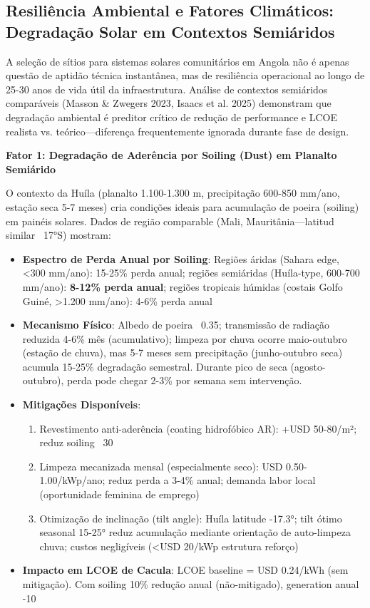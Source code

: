 \documentclass[12pt, a4paper]{article}
\begin{document}
\subsection{Resiliência Ambiental e Fatores Climáticos: Degradação Solar em Contextos Semiáridos}

A seleção de sítios para sistemas solares comunitários em Angola não é apenas questão de aptidão técnica instantânea, mas de resiliência operacional ao longo de 25-30 anos de vida útil da infraestrutura. Análise de contextos semiáridos comparáveis (Masson \& Zwegers 2023, Isaacs et al. 2025) demonstram que degradação ambiental é preditor crítico de redução de performance e LCOE realista vs. teórico—diferença frequentemente ignorada durante fase de design.

\textbf{Fator 1: Degradação de Aderência por Soiling (Dust) em Planalto Semiárido}

O contexto da Huíla (planalto 1.100-1.300 m, precipitação 600-850 mm/ano, estação seca 5-7 meses) cria condições ideais para acumulação de poeira (soiling) em painéis solares. Dados de região comparable (Mali, Mauritânia—latitud similar ~17°S) mostram:

\begin{itemize}
\item \textbf{Espectro de Perda Anual por Soiling}: Regiões áridas (Sahara edge, <300 mm/ano): 15-25\% perda anual; regiões semiáridas (Huíla-type, 600-700 mm/ano): \textbf{8-12\% perda anual}; regiões tropicais húmidas (costais Golfo Guiné, >1.200 mm/ano): 4-6\% perda anual
\item \textbf{Mecanismo Físico}: Albedo de poeira ~0.35; transmissão de radiação reduzida 4-6\% mês (acumulativo); limpeza por chuva ocorre maio-outubro (estação de chuva), mas 5-7 meses sem precipitação (junho-outubro seca) acumula 15-25\% degradação semestral. Durante pico de seca (agosto-outubro), perda pode chegar 2-3\% por semana sem intervenção.
\item \textbf{Mitigações Disponíveis}:
  \begin{enumerate}
  \item Revestimento anti-aderência (coating hidrofóbico AR): +USD 50-80/m²; reduz soiling ~30%
  \item Limpeza mecanizada mensal (especialmente seco): USD 0.50-1.00/kWp/ano; reduz perda a 3-4\% anual; demanda labor local (oportunidade feminina de emprego)
  \item Otimização de inclinação (tilt angle): Huíla latitude -17.3°; tilt ótimo seasonal 15-25° reduz acumulação mediante orientação de auto-limpeza chuva; custos negligíveis (<USD 20/kWp estrutura reforço)
  \end{enumerate}
\item \textbf{Impacto em LCOE de Cacula}: LCOE baseline = USD 0.24/kWh (sem mitigação). Com soiling 10\% redução anual (não-mitigado), generation anual -10%
\end{itemize}
\end{document}
